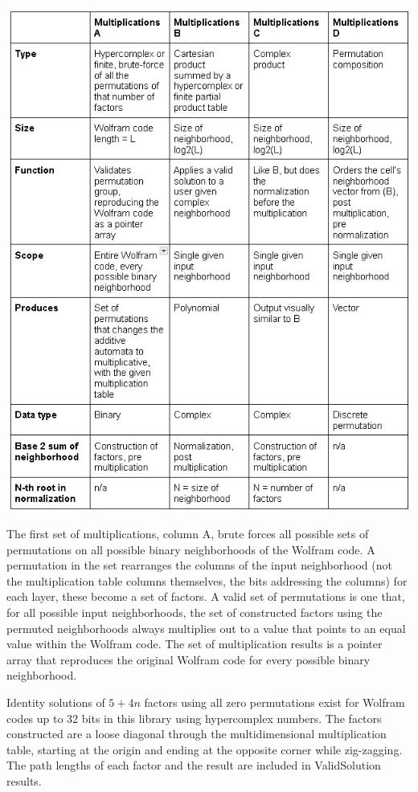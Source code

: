 \documentclass[11pt]{article}
\begin{document}
\begin{center}
\includegraphics{MultiplicationsDiagram.jpg}
\end{center}



The first set of multiplications, column A, brute forces all possible sets of permutations on all possible binary neighborhoods of the Wolfram code. A permutation in the set rearranges the columns of the input neighborhood (not the multiplication table columns themselves, the bits addressing the columns) for each layer, these become a set of factors.  A valid set of permutations is one that, for all possible input neighborhoods, the set of constructed factors using the permuted neighborhoods always multiplies out to a value that points to an equal value within the Wolfram code. The set of multiplication results is a pointer array that reproduces the original Wolfram code for every possible binary neighborhood. 

Identity solutions of $5+4n$ factors using all zero permutations exist for Wolfram codes up to 32 bits in this library using hypercomplex numbers. The factors constructed are a loose diagonal through the multidimensional multiplication table, starting at the origin and ending at the opposite corner while zig-zagging. The path lengths of each factor and the result are included in ValidSolution results.
\end{document}
